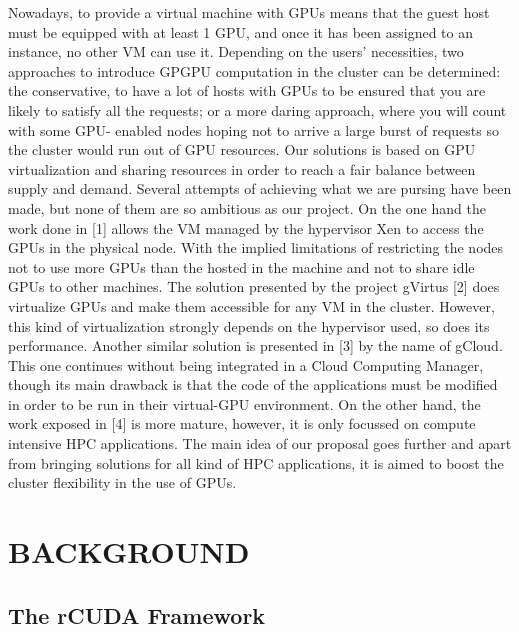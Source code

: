 \documentclass[a4paper,twoside]{article}
\begin{document}
\noindent 
Nowadays, to provide a virtual machine with GPUs means
that the guest host must be equipped with at least 1 GPU, and
once it has been assigned to an instance, no other VM can use
it. Depending on the users’ necessities, two approaches to introduce GPGPU computation in the cluster can be determined:
the conservative, to have a lot of hosts with GPUs to be
ensured that you are likely to satisfy all the requests; or a
more daring approach, where you will count with some GPU-
enabled nodes hoping not to arrive a large burst of requests
so the cluster would run out of GPU resources. Our solutions
is based on GPU virtualization and sharing resources in order
to reach a fair balance between supply and demand.
Several attempts of achieving what we are pursing have been
made, but none of them are so ambitious as our project. On
the one hand the work done in [1] allows the VM managed
by the hypervisor Xen to access the GPUs in the physical
node. With the implied limitations of restricting the nodes not
to use more GPUs than the hosted in the machine and not
to share idle GPUs to other machines. The solution presented
by the project gVirtus [2] does virtualize GPUs and make
them accessible for any VM in the cluster. However, this kind
of virtualization strongly depends on the hypervisor used, so
does its performance. Another similar solution is presented in
[3] by the name of gCloud. This one continues without being
integrated in a Cloud Computing Manager, though its main
drawback is that the code of the applications must be modified
in order to be run in their virtual-GPU environment. On the
other hand, the work exposed in [4] is more mature, however,
it is only focussed on compute intensive HPC applications.
The main idea of our proposal goes further and apart from
bringing solutions for all kind of HPC applications, it is aimed
to boost the cluster flexibility in the use of GPUs.

\section{\uppercase{Background}}
\label{sec:background}
\subsection{The rCUDA Framework}
\label{sec:rcuda}
\end{document}
